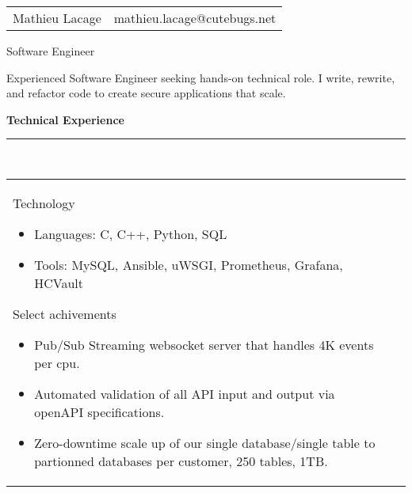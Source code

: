 \documentclass[a4paper,12pt]{article}
\newcommand{\ligne}[1]{\rule[0.5ex]{\textwidth}{#1}\\}
\newcommand{\styleRub}[1]{\textbf{\large #1}\par}
\newcommand{\indentStd}{\noindent\hspace*{10pt}}
\newenvironment{rubrique}[2][\linewidth]%
{\styleRub{#2}%
\ligne{0.5mm}
\setlength{\lenB}{#1}%
\setlength{\lenC}{\linewidth}%
\addtolength{\lenC}{-\lenA}%
\addtolength{\lenC}{-\lenB}%
\addtolength{\lenC}{-19pt}
\indentStd\begin{tabular}[t]{p{\lenB}p{\lenC}}}
{\end{tabular}}
\newlength{\lenA} %
\newlength{\lenB} %
\newlength{\lenC} %
\begin{document}
\begin{tabular*}{1\textwidth}{@{\extracolsep{\fill}}lr}
Mathieu Lacage & mathieu.lacage@cutebugs.net\\
\end{tabular*}

\vspace{1cm}
\begin{center}{\huge Software Engineer}\end{center}

\begin{center}
Experienced Software Engineer seeking hands-on technical role.\newline
I write, rewrite, and refactor code to create
secure applications that scale.
\end{center}

\vspace{1cm}
\begin{rubrique}{Technical Experience}

Technology
\begin{itemize}
\item Languages: C, C++, Python, SQL
\item Tools: MySQL, Ansible, uWSGI, Prometheus, Grafana, HCVault
\end{itemize}

Select achivements 
\begin{itemize}
\item Pub/Sub Streaming websocket server that handles 4K events per cpu.
\item Automated validation of all API input and output via openAPI specifications.
\item Zero-downtime scale up of our single database/single table to partionned
 databases per customer, 250 tables, 1TB.
\end{itemize}

\end{rubrique}
\end{document}
